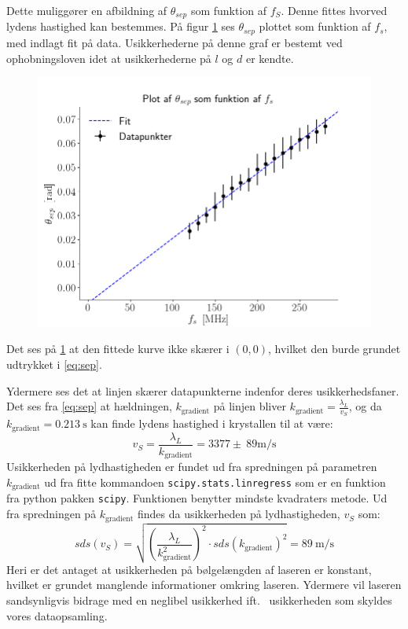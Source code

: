 \documentclass[main]{subfiles}
\begin{document}
Dette muliggører en afbildning af $\theta_{sep}$ som funktion af $f_S$. Denne fittes hvorved lydens hastighed kan bestemmes.
På figur \cref{fig:graf1} ses $\theta_{sep}$ plottet som funktion af $f_s$, med indlagt fit på data. Usikkerhederne på denne graf er bestemt ved ophobningsloven idet at usikkerhederne på $l$ og $d$ er kendte.
\begin{figure}[H]
    \centering
    \includegraphics[width=\linewidth]{tegninger/graf1.png}
    \caption{}
    \label{fig:graf1}
\end{figure}
Det ses på \cref{fig:graf1} at den fittede kurve ikke skærer i $(0,0)$, hvilket den burde grundet udtrykket i \cref{eq:sep}.

Ydermere ses det at linjen skærer datapunkterne indenfor deres usikkerhedsfaner. Det ses fra \cref{eq:sep} at hældningen, $k_{\text{gradient}}$ på linjen bliver $ k_{\text{gradient}} = \frac{\lambda_L}{v_S}$, og da $k_{\text{gradient}} = \SI{0,213}{\second}$ kan finde lydens hastighed i krystallen til at være:
\begin{equation}
    \nonumber v_S = \frac{\lambda_L}{k_{\text{gradient}}} = 3377 \pm \ 89 \si{\meter\per\second}
\end{equation}
Usikkerheden på lydhastigheden er fundet ud fra spredningen på parametren $k_{\text{gradient}}$ ud fra fitte kommandoen \texttt{scipy.stats.linregress} som er en funktion fra python pakken \texttt{scipy}. Funktionen benytter mindste kvadraters metode. Ud fra spredningen på $k_{\text{gradient}}$ findes da usikkerheden på lydhastigheden, $v_S$ som:
\begin{equation}
    \nonumber sds(v_S) = \sqrt{\left(\frac{\lambda_L}{k_{\text{gradient}}^2}\right)^2 \cdot sds(k_{\text{gradient}})^2} = \SI{89}{\meter\per\second}
\end{equation}
Heri er det antaget at usikkerheden på bølgelængden af laseren er konstant, hvilket er grundet manglende informationer omkring laseren. Ydermere vil laseren sandsynligvis bidrage med en neglibel usikkerhed ift. \ usikkerheden som skyldes vores dataopsamling.
\end{document}
